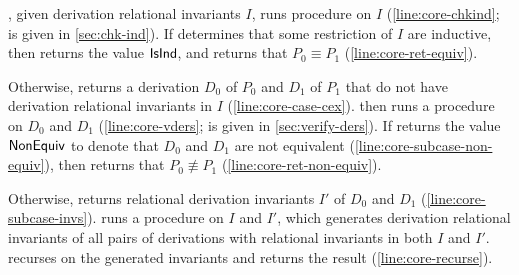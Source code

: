 \verifyaux, given derivation relational invariants $I$, runs procedure
\chkinductive on $I$ (\autoref{line:core-chkind}; 
%
\chkinductive is given in \autoref{sec:chk-ind}).
%
If \chkinductive determines that some restriction of $I$ are
inductive, then \chkinductive returns the value $\mathsf{IsInd}$, and
\verifyaux returns that $P_0 \equiv P_1$
(\autoref{line:core-ret-equiv}).

Otherwise, \chkinductive returns a derivation $D_0$ of $P_0$ and $D_1$
of $P_1$ that do not have derivation relational
invariants in $I$ (\autoref{line:core-case-cex}).
%
\verifyaux then runs a procedure \verifyders on $D_0$ and $D_1$
(\autoref{line:core-vders}; \verifyders is given in
\autoref{sec:verify-ders}).
%
If \verifyders returns the value $\mathsf{NonEquiv}$ to denote that $D_0$ and
$D_1$ are not equivalent (\autoref{line:core-subcase-non-equiv}), then
\verifyaux returns that $P_0 \not\equiv P_1$
(\autoref{line:core-ret-non-equiv}).

Otherwise, \verifyders returns relational derivation invariants $I'$
of $D_0$ and $D_1$ (\autoref{line:core-subcase-invs}).
%
\verifyaux runs a procedure \mergeinvs on $I$ and $I'$, which
generates derivation relational invariants of all pairs of derivations
with relational invariants in both $I$ and $I'$.
%
\verifyaux recurses on the generated invariants and returns the result
(\autoref{line:core-recurse}).


